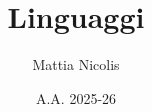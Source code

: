 \documentclass[a4paper,12pt,openright]{book}
\title{\textbf{Linguaggi}}
\author{Mattia Nicolis}
\date{A.A. 2025-26}
\begin{document}
    \maketitle

    \tableofcontents
    \markboth{}{}
\end{document}
